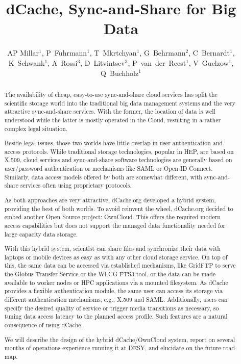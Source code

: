 \documentclass[a4paper]{jpconf}
\begin{document}
\title{dCache, Sync-and-Share for Big Data}

\author{AP Millar$^1$, P~Fuhrmann$^1$, T~Mkrtchyan$^1$,
  G~Behrmann$^2$, C~Bernardt$^1$, K~Schwank$^1$, A~Rossi$^3$,
  D~Litvintsev$^3$, P~van~der~Reest$^1$, V~Guelzow$^1$,
  Q~Buchholz$^1$}

\address{$^1$ IT Dept., DESY, Notkestrasse 85, Hamburg, Germany}
\address{$^2$ Gerd Behrmann, Copenhagen, Denmark}
\address{$^3$ Fermilab, Chicago, IL, USA}


\begin{abstract}
The availability of cheap, easy-to-use sync-and-share cloud services
has split the scientific storage world into the traditional big data
management systems and the very attractive sync-and-share
services. With the former, the location of data is well understood
while the latter is mostly operated in the Cloud, resulting in a
rather complex legal situation.

Beside legal issues, those two worlds have little overlap in user
authentication and access protocols. While traditional storage
technologies, popular in HEP, are based on X.509, cloud services and
sync-and-share software technologies are generally based on
user/password authentication or mechanisms like SAML or Open ID
Connect. Similarly, data access models offered by both are somewhat
different, with sync-and-share services often using proprietary
protocols.

As both approaches are very attractive, dCache.org developed a hybrid
system, providing the best of both worlds. To avoid reinvent the
wheel, dCache.org decided to embed another Open Source project:
OwnCloud. This offers the required modern access capabilities but does
not support the managed data functionality needed for large capacity
data storage.

With this hybrid system, scientist can share files and synchronize
their data with laptops or mobile devices as easy as with any other
cloud storage service. On top of this, the same data can be accessed
via established mechanisms, like GridFTP to serve the Globus Transfer
Service or the WLCG FTS3 tool, or the data can be made available to
worker nodes or HPC applications via a mounted filesystem. As dCache
provides a flexible authentication module, the same user can access
its storage via different authentication mechanisms; e.g., X.509 and
SAML. Additionally, users can specify the desired quality of service
or trigger media transitions as necessary, so tuning data access
latency to the planned access profile. Such features are a natural
consequence of using dCache.

We will describe the design of the hybrid dCache/OwnCloud system,
report on several months of operations experience running it at DESY,
and elucidate on the future road-map.
\end{abstract}
\end{document}
